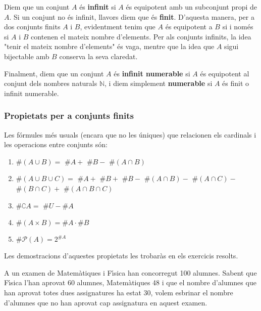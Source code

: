 \bigskip

Diem que un conjunt $A$ \'{e}s \textbf{infinit} si $A$ \'{e}s equipotent amb
un subconjunt propi de $A$. Si un conjunt no \'{e}s infinit, llavors diem
que \'{e}s \textbf{finit}. D'aquesta manera, per a dos conjunts finits $A$ i
$B$, evidentment tenim que $A$ \'{e}s equipotent a $B$ si i nom\'{e}s si $A$
i $B$ contenen el mateix nombre d'elements. Per als conjunts infinits, la
idea "tenir el mateix nombre d'elements" \'{e}s vaga, mentre que la idea que
$A$ sigui bijectable amb $B$ conserva la seva claredat.

\bigskip

Finalment, diem que un conjunt $A$ \'{e}s \textbf{infinit numerable} si $A$
\'{e}s equipotent al conjunt dels nombres naturals $\mathbb{N}$, i diem
simplement \textbf{numerable} si $A$ \'{e}s finit o infinit numerable.

\subsubsection{Propietats per a conjunts finits}

Les f\'{o}rmules m\'{e}s usuals (encara que no les \'{u}niques) que
relacionen els cardinals i les operacions entre conjunts s\'{o}n:

\begin{enumerate}
\item $\#\left( A\cup B\right) =$ $\#A+$ $\#B-$ $\#\left( A\cap B\right) $

\item $\#\left( A\cup B\cup C\right) =$ $\#A+$ $\#B+$ $\#B-$ $\#\left( A\cap
B\right) -$ $\#\left( A\cap C\right) -$ $\#\left( B\cap C\right) +$ $%
\#\left( A\cap B\cap C\right) $

\item $\#\complement A=$ $\#U-\#A$

\item $\#\left( A\times B\right) =\#A\cdot\#B$

\item $\#\mathcal{P}(A)=2^{\#A}$
\end{enumerate}

Les demostracions d'aquestes propietats les trobar\`{a}s en els exercicis
resolts.

\begin{exem}
A un examen de Matem\`{a}tiques i F\'{\i}sica han concorregut 100 alumnes.
Sabent que F\'{\i}sica l'han aprovat 60 alumnes, Matem\`{a}tiques 48 i que
el nombre d'alumnes que han aprovat totes dues assignatures ha estat 30,
volem esbrinar el nombre d'alumnes que no han aprovat cap assignatura en
aquest examen.
\end{exem}

